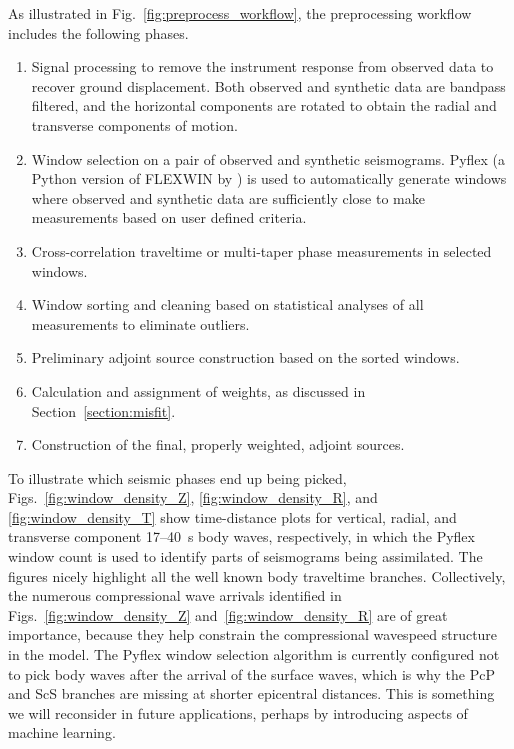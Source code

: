 \documentclass[extra,mreferee]{gji}
\begin{document}
As illustrated in Fig.~\ref{fig:preprocess_workflow}, the preprocessing workflow
includes the following phases.
\begin{enumerate}
  \item Signal processing to remove the instrument response from observed data
    to recover ground displacement. Both observed and synthetic data are bandpass
    filtered, and the horizontal components are rotated to obtain the radial and transverse components of motion.
  \item Window selection on a pair of
    observed and synthetic seismograms. Pyflex (a Python version
    of FLEXWIN by \citet{krischer2015}) is
    used to automatically generate windows where observed and
    synthetic data are sufficiently close to make measurements based on user defined
    criteria.
  \item Cross-correlation traveltime or multi-taper phase measurements in selected windows.
  \item Window sorting and cleaning based on statistical analyses of all measurements to eliminate outliers.
  \item Preliminary adjoint source construction based on the sorted windows.
  \item Calculation and assignment of weights, as discussed in Section~\ref{section:misfit}.
  \item Construction of the final, properly weighted, adjoint sources.
\end{enumerate}

To illustrate which seismic phases end up being picked,
Figs.~\ref{fig:window_density_Z}, \ref{fig:window_density_R}, and \ref{fig:window_density_T} show time-distance plots
for vertical, radial, and transverse component 17--40~s body waves,
respectively,
in which the Pyflex window count is used to identify parts of seismograms being assimilated.
The figures nicely highlight all the well known body traveltime branches.
Collectively, the numerous compressional wave arrivals identified in Figs.~\ref{fig:window_density_Z} and~\ref{fig:window_density_R} are of great importance, because they help constrain the compressional wavespeed structure in the model.
The Pyflex window selection algorithm is currently configured not to pick body waves after the arrival of the surface waves, which is why the PcP and ScS branches are missing at shorter epicentral distances.
This is something we will reconsider in future applications, perhaps by introducing aspects of machine learning. 
\end{document}
